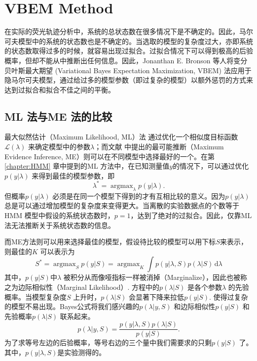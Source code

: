 \documentclass[11pt, a4paper]{article}
\DeclareMathOperator*{\argmax}{argmax}
\begin{document}
\section{VBEM Method}\label{chapter:VBEM}

    在实际的荧光轨迹分析中，系统的总状态数在很多情况下是不确定的。因此，马尔可夫模型中的系统的状态数也是不确定的。当选取的模型的复杂度过大，亦即系统的状态数取得过多的时候，就容易出现过拟合。过拟合情况下可以得到极高的后验概率，但却不能从中推断出任何信息。因此，Jonanthan E. Bronson 等人将变分贝叶斯最大期望 (Variational Bayes Expectation Maximization, VBEM) 法应用于隐马尔可夫模型\cite{VBEM}，通过给过多的模型参数（即过复杂的模型）以额外惩罚的方式来达到过拟合和拟合不佳之间的平衡。

    \subsection{ML 法与ME 法的比较}
    最大似然估计（Maximum Likelihood, ML）法\cite{wiki:mle} 通过优化一个相似度目标函数$\mathcal L(\lambda)$ 来确定模型中的参数$\lambda$；而文献\cite{VBEM} 中提出的最可能推断（Maximum Evidence Inference, ME）则可以在不同模型中选择最好的一个。在第\ref{chapter:HMM} 章中提到的ML 方法中，在已知测量值$y$的情况下，可以通过优化$p(y|\lambda)$ 来得到最佳的模型参数，即
    \begin{equation}\label{eqn:ML_estimate}
      \lambda^* = \argmax_\lambda p(y| \lambda).
    \end{equation}
    但概率$p(y|\lambda)$ 必须是在同一个模型下得到的才有互相比较的意义。因为$p(y|\lambda)$ 总是可以通过增加模型的复杂度来变得更大。当离散的实验数据点的个数等于HMM 模型中假设的系统状态数时，$p=1$，达到了绝对的过拟合。因此，仅靠ML 法无法推断关于系统状态数的信息。

    而ME方法则可以用来选择最佳的模型，假设待比较的模型可以用下标$S$来表示，则最佳的$K$ 可以表示为
    \begin{equation}\label{eqn:ME_model}
      S^* = \argmax_S p(y| S) = \argmax_K \int p(y| \lambda, S)p(\lambda| S)\,\mathrm d\lambda
    \end{equation}
    其中，$p(y| S)$中$\lambda$ 被积分从而像哑指标一样被消掉（Marginalize），因此也被称之为边际相似性（Marginal Likelihood）. 方程中的$p(\lambda | S)$ 是各个参数$\lambda$ 的先验概率。当模型复杂度$S$ 上升时，$p(\lambda | S)$ 会显著下降来拉低$p(y| S)$. 使得过复杂的模型不易出现。Bayes公式将我们感兴趣的$p(\lambda|y,S)$ 和边际相似性$p(y|S)$ 和先验概率$p(\lambda|S)$ 联系起来。
    \begin{equation}\label{eqn:bayes_vbem}
      p(\lambda| y, S) = \frac{p(y| \lambda, S)p(\lambda| S)}{p(y| S)}.
    \end{equation}
    为了求等号左边的后验概率，等号右边的三个量中我们需要求的只剩$p(y| S)$ 了。其中，$p(y| \lambda, S)$是实验测得的。
\end{document}
